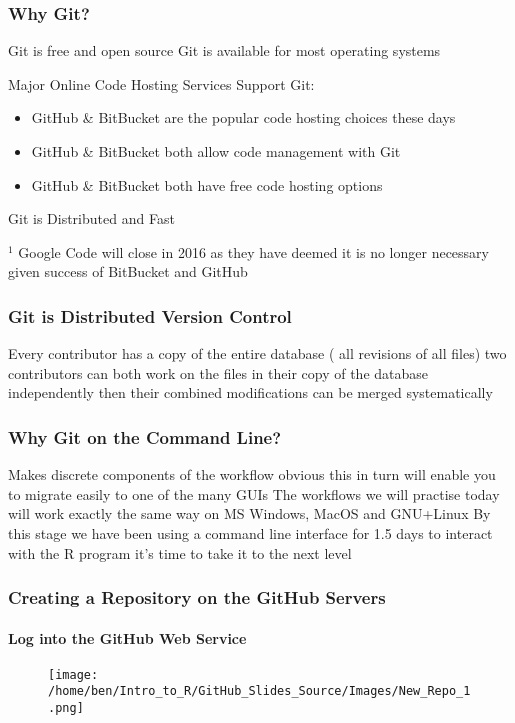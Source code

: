 \documentclass[xcolor=dvipsnames]{beamer}
\begin{document}
\begin{frame}
\frametitle{Why Git?}

Git is free and open source
\newline
\newline
Git is available for most operating systems
\newline
\newline
\begin{block}{Major Online Code Hosting Services Support Git:}
\begin{itemize}
\item GitHub \& BitBucket are the popular code hosting choices these days
\item GitHub \& BitBucket both allow code management with Git
\item GitHub \& BitBucket both have free code hosting options
\end{itemize}
\end{block}

Git is Distributed and Fast

\tiny $^1$ Google Code will close in 2016 as they have deemed it is no longer necessary given success of BitBucket and GitHub

\end{frame}



\begin{frame} 
\frametitle{Git is Distributed Version Control}
Every contributor has a copy of the entire database ( all revisions of all files)
two contributors can both work on the files in their copy of the database independently then their combined modifications can be merged systematically
\end{frame} 

\begin{frame}
\frametitle{Why Git on the Command Line?}
Makes discrete components of the workflow obvious this in turn will enable you to migrate easily to one of the many GUIs
\newline
\newline
The workflows we will practise today will work exactly the same way on MS Windows, MacOS and GNU+Linux
\newline
\newline
By this stage we have been using a command line interface for 1.5 days to interact with the R program it's time to take it to the next level
\end{frame}

\begin{frame}
\frametitle{Creating a Repository on the GitHub Servers}
\framesubtitle{Log into the GitHub Web Service}
\begin{center}
\begin{figure}
\texttt{[image: /home/ben/Intro\_to\_R/GitHub\_Slides\_Source/Images/New\_Repo\_1.png]}
\end{figure}
\end{center}
\end{frame}
\end{document}
